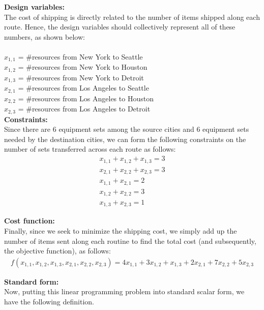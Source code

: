 \documentclass[11pt]{article}
\begin{document}
\begin{prob}{2}
\end{prob}
\begin{sol} 

\textbf{Design variables:}\\ 
The cost of shipping is directly related to the number of items shipped along each route. Hence, the design variables should collectively represent all of these numbers, as shown below: \\ \\
$x_{1,1}$ = \#resources from New York to Seattle\\
$x_{1,2}$ = \#resources from New York to Houston\\
$x_{1,3}$ = \#resources from New York to Detroit \\
$x_{2,1}$ = \#resources from Los Angeles to Seattle \\
$x_{2,2}$ = \#resources from Los Angeles to Houston \\
$x_{2,3}$ = \#resources from Los Angeles to Detroit \\

\textbf{Constraints:} \\
Since there are $6$ equipment sets among the source cities and $6$ equipment sets needed by the destination cities, we can form the following constraints on the number of sets transferred across each route as follows:
\begin{eqnarray*}
x_{1,1} + x_{1,2} + x_{1,3} = 3 \\
x_{2,1} + x_{2,2} + x_{2,3} = 3 \\
x_{1,1} + x_{2,1} = 2 \\
x_{1,2} + x_{2,2} = 3 \\
x_{1,3} + x_{2,3} = 1 
\end{eqnarray*}

\textbf{Cost function:} \\
Finally, since we seek to minimize the shipping cost, we simply add up the number of items sent along each routine to find the total cost (and subsequently, the objective function), as follows:
\begin{eqnarray*}
f(x_{1,1},x_{1,2},x_{1,3},x_{2,1},x_{2,2},x_{2,3}) = 4x_{1,1} + 3x_{1,2} + x_{1,3} + 2x_{2,1} + 7x_{2,2} + 5x_{2,3}
\end{eqnarray*}

\textbf{Standard form:} \\
Now, putting this linear programming problem into standard scalar form, we have the following definition. \\


\end{sol}
\end{document}
